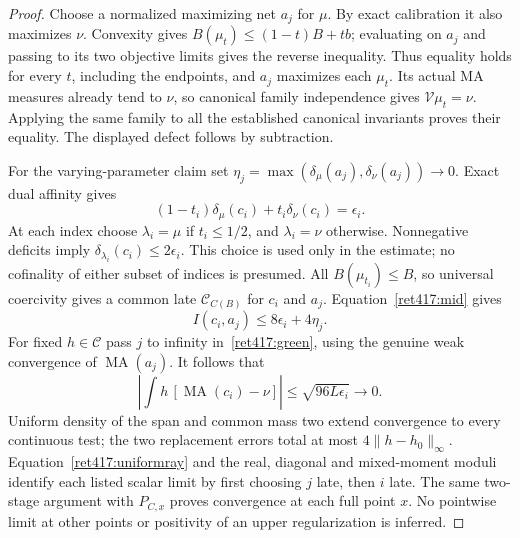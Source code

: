 \documentclass[11pt]{article}
\newcommand{\MA}{\operatorname{MA}}
\newcommand{\C}{\mathcal C}
\newcommand{\V}{\mathcal V}
\begin{document}
\begin{proof}
Choose a normalized maximizing net $a_j$ for $\mu$. By exact
calibration it also maximizes $\nu$. Convexity gives
$B(\mu_t)\le(1-t)B+tb$; evaluating on $a_j$ and passing to its
two objective limits gives the reverse inequality. Thus equality holds
for every $t$, including the endpoints, and $a_j$ maximizes each
$\mu_t$. Its actual MA measures already tend to $\nu$, so canonical
family independence gives $\V\mu_t=\nu$. Applying the same family
to all the established canonical invariants proves their equality.
The displayed defect follows by subtraction.

For the varying-parameter claim set
$\eta_j=\max(\delta_\mu(a_j),\delta_\nu(a_j))\to0$. Exact dual
affinity gives
\[
 (1-t_i)\delta_\mu(c_i)+t_i\delta_\nu(c_i)=\epsilon_i.
\]
At each index choose $\lambda_i=\mu$ if $t_i\le1/2$, and
$\lambda_i=\nu$ otherwise. Nonnegative deficits imply
$\delta_{\lambda_i}(c_i)\le2\epsilon_i$. This choice is used only
in the estimate; no cofinality of either subset of indices is presumed.
All $B(\mu_{t_i})\le B$, so universal coercivity gives a common
late $\C_{C(B)}$ for $c_i$ and $a_j$. Equation~\eqref{ret417:mid} gives
\begin{equation}\label{ret417:uniformray}
 I(c_i,a_j)\le8\epsilon_i+4\eta_j.
\end{equation}
For fixed $h\in\C$ pass $j$ to infinity in~\eqref{ret417:green}, using
the genuine weak convergence of $\MA(a_j)$. It follows that
\[
 \left|\int h\,[\MA(c_i)-\nu]\right|
       \le\sqrt{96L\epsilon_i}\longrightarrow0.
\]
Uniform density of the span and common mass two extend convergence
to every continuous test; the two replacement errors total at most
$4\|h-h_0\|_\infty$. Equation~\eqref{ret417:uniformray} and the real,
diagonal and mixed-moment moduli identify each listed scalar limit
by first choosing $j$ late, then $i$ late. The same two-stage argument
with $P_{C,x}$ proves convergence at each full point $x$.
No pointwise limit at other points or positivity of an upper
regularization is inferred.
\end{proof}
\end{document}
